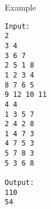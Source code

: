 Example
\begin{verbatim}
Input:
2
3 4
3 6 7
2 5 1 8
1 2 3 4
8 7 6 5
9 12 10 11
4 4
1 3 5 7
2 4 2 8
1 4 7 3
4 7 5 3
5 7 8 3
5 3 6 8

Output:
110
54
\end{verbatim}